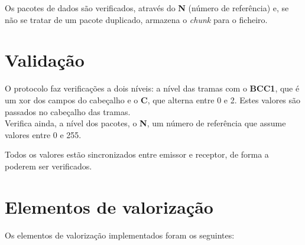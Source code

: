 \documentclass[a4paper,11pt]{article}
\begin{document}
Os pacotes de dados são verificados, através do \textbf{N} (número de referência) e, se não se tratar de um pacote duplicado, armazena o \textit{chunk} para o ficheiro.

\section{Validação}

O protocolo faz verificações a dois níveis: a nível das tramas com o \textbf{BCC1}, que é um xor dos campos do cabeçalho e o \textbf{C}, que alterna entre 0 e 2. Estes valores são passados no cabeçalho das tramas.\\
Verifica ainda, a nível dos pacotes, o \textbf{N}, um número de referência que assume valores entre 0 e 255.

Todos os valores estão sincronizados entre emissor e receptor, de forma a poderem ser verificados.

\section{Elementos de valorização}

Os elementos de valorização implementados foram os seguintes:
\end{document}
